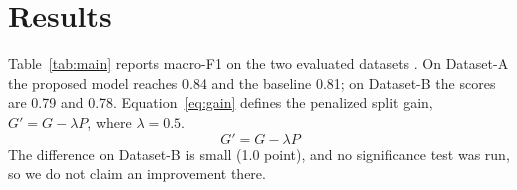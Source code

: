 \section{Results}
Table~\ref{tab:main} reports macro-F1 on the two evaluated datasets \cite{smith2024,lee2023}. On Dataset-A the proposed model reaches 0.84 and the baseline 0.81; on Dataset-B the scores are 0.79 and 0.78. Equation~\eqref{eq:gain} defines the penalized split gain, $G' = G - \lambda P$, where $\lambda = 0.5$.
\begin{equation}
G' = G - \lambda P \label{eq:gain}
\end{equation}
The difference on Dataset-B is small (1.0 point), and no significance test was run, so we do not claim an improvement there.
